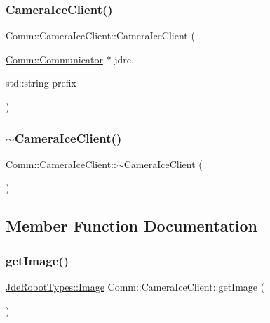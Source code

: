 \subsubsection{\texorpdfstring{Camera\+Ice\+Client()}{CameraIceClient()}}
{\footnotesize\ttfamily Comm\+::\+Camera\+Ice\+Client\+::\+Camera\+Ice\+Client (\begin{DoxyParamCaption}\item[{\hyperlink{class_comm_1_1_communicator}{Comm\+::\+Communicator} $\ast$}]{jdrc,  }\item[{std\+::string}]{prefix }\end{DoxyParamCaption})}

\mbox{\label{class_comm_1_1_camera_ice_client_a2c506c1c710f2f9daae1a62bd743ffbc}} 
\subsubsection{\texorpdfstring{$\sim$\+Camera\+Ice\+Client()}{~CameraIceClient()}}
{\footnotesize\ttfamily Comm\+::\+Camera\+Ice\+Client\+::$\sim$\+Camera\+Ice\+Client (\begin{DoxyParamCaption}{ }\end{DoxyParamCaption})\hspace{0.3cm}{\ttfamily [virtual]}}



\subsection{Member Function Documentation}
\mbox{\label{class_comm_1_1_camera_ice_client_aff1f3ff0d95d8a04aacfe5cfc9955740}} 
\subsubsection{\texorpdfstring{get\+Image()}{getImage()}}
{\footnotesize\ttfamily \hyperlink{class_jde_robot_types_1_1_image}{Jde\+Robot\+Types\+::\+Image} Comm\+::\+Camera\+Ice\+Client\+::get\+Image (\begin{DoxyParamCaption}{ }\end{DoxyParamCaption})\hspace{0.3cm}{\ttfamily [virtual]}}



